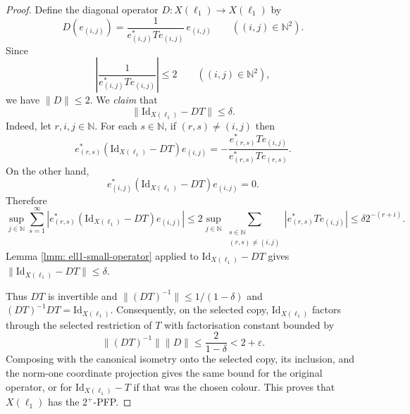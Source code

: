\documentclass[11pt]{amsart}
\theoremstyle{plain}
\theoremstyle{definition}
\numberwithin{equation}{section}
\newcommand{\norm}[1]{\lVert #1 \rVert}
\newcommand{\N}{\mathbb{N}}
\newcommand{\Id}{\mathrm{Id}}
\renewcommand{\leq}{\leqslant}
\begin{document}
\begin{proof}
    Define the diagonal operator $D \colon X(\ell_1) \to X(\ell_1)$ by
    \begin{equation*}
        D(e_{(i,j)})
        =
        \frac{1}{e^*_{(i,j)} T e_{(i,j)}}\,e_{(i,j)}
        \qquad ((i,j)\in\N^2).
    \end{equation*}
    Since
    \begin{equation*}
        \left|\frac{1}{e^*_{(i,j)} T e_{(i,j)}}\right| \leq 2
        \qquad ((i,j)\in\N^2),
    \end{equation*}
    we have $\norm{D} \leq 2$.  We \emph{claim} that
    \begin{equation*}
        \norm{\Id_{X(\ell_1)} - DT} \leq \delta.
    \end{equation*}
    Indeed, let $r,i,j \in \N$. For each $s \in \N$, if $(r,s)\neq(i,j)$ then
    \begin{equation*}
        e^*_{(r,s)}(\Id_{X(\ell_1)} - DT)e_{(i,j)}
        =
        -\frac{e^*_{(r,s)} T e_{(i,j)}}{e^*_{(r,s)} T e_{(r,s)}}.
    \end{equation*}
    On the other hand,
    \begin{equation*}
        e^*_{(i,j)}(\Id_{X(\ell_1)} - DT)e_{(i,j)} = 0.
    \end{equation*}
    Therefore
    \begin{equation*}
        \sup_{j \in \N} \sum_{s=1}^\infty |e^*_{(r,s)}(\Id_{X(\ell_1)} - DT)e_{(i,j)}|
        \leq
        2 \sup_{j \in \N} \sum_{\substack{s \in \N\\(r,s)\neq(i,j)}} |e^*_{(r,s)} T e_{(i,j)}| \leq
        \delta 2^{-(r+i)}.
    \end{equation*}
    Lemma \ref{lmm: ell1-small-operator} applied to $\Id_{X(\ell_1)} - DT$ gives $\norm{\Id_{X(\ell_1)} - DT} \leq \delta$.

    Thus $DT$ is invertible and $\norm{(DT)^{-1}} \leq 1/(1 - \delta)$ and $(DT)^{-1} DT = \Id_{X(\ell_1)}$.
    Consequently, on the selected copy, $\Id_{X(\ell_1)}$ factors through the selected restriction of $T$ with factorisation constant bounded by
    \begin{equation*}
        \norm{(DT)^{-1}}\norm{D} \leq \frac{2}{1-\delta} <
        2+\varepsilon.
    \end{equation*}
    Composing with the canonical isometry onto the selected copy, its inclusion, and the norm-one coordinate projection gives the same bound for the original operator, or for $\Id_{X(\ell_1)}-T$ if that was the chosen colour. This proves that $X(\ell_1)$ has the $2^+$-PFP.
\end{proof}
\end{document}
